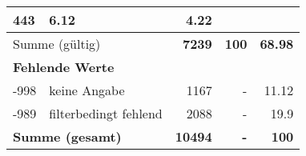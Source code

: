 \begin{longtable}{lXrrr}
       \num{443} &
       \num[round-mode=places,round-precision=2]{6.12} &
         \num[round-mode=places,round-precision=2]{4.22} \\
     \midrule
     \multicolumn{2}{l}{Summe (gültig)} &
       \textbf{\num{7239}} &
     \textbf{\num{100}} &
       \textbf{\num[round-mode=places,round-precision=2]{68.98}} \\
     \multicolumn{5}{l}{\textbf{Fehlende Werte}}\\
       -998 &
       keine Angabe &
         \num{1167} &
        - &
         \num[round-mode=places,round-precision=2]{11.12} \\
       -989 &
       filterbedingt fehlend &
         \num{2088} &
        - &
         \num[round-mode=places,round-precision=2]{19.9} \\
     \midrule
     \multicolumn{2}{l}{\textbf{Summe (gesamt)}} &
          \textbf{\num{10494}} &
        \textbf{-} &
        \textbf{\num{100}} \\
     \bottomrule
     \end{longtable}
     
